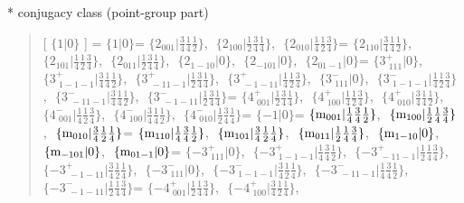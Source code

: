 \documentclass[fleqn,10pt,landscape]{jsarticle}
\begin{document}
* conjugacy class (point-group part)
\begin{quote}
[ $\{1|0\}$ ] = \quad $\{1|0\}$ = \quad $\{2{}_{001}|\frac{3}{4} \frac{1}{4} \frac{1}{2}\}$,\,\, $\{2{}_{100}|\frac{1}{2} \frac{3}{4} \frac{1}{4}\}$,\,\, $\{2{}_{010}|\frac{1}{4} \frac{1}{2} \frac{3}{4}\}$ = \quad $\{2{}_{110}|\frac{3}{4} \frac{1}{4} \frac{1}{2}\}$,\,\, $\{2{}_{101}|\frac{1}{4} \frac{1}{2} \frac{3}{4}\}$,\,\, $\{2{}_{011}|\frac{1}{2} \frac{3}{4} \frac{1}{4}\}$,\,\, $\{2{}_{1-10}|0\}$,\,\, $\{2{}_{-101}|0\}$,\,\, $\{2{}_{01-1}|0\}$\newline[ $\{3^{+}_{\,\,111}|0\}$ ] = \quad $\{3^{+}_{\,\,111}|0\}$,\,\, $\{3^{+}_{\,\,1-1-1}|\frac{3}{4} \frac{1}{4} \frac{1}{2}\}$,\,\, $\{3^{+}_{\,\,-11-1}|\frac{1}{2} \frac{3}{4} \frac{1}{4}\}$,\,\, $\{3^{+}_{\,\,-1-11}|\frac{1}{4} \frac{1}{2} \frac{3}{4}\}$,\,\, $\{3^{-}_{\,\,111}|0\}$,\,\, $\{3^{-}_{\,\,1-1-1}|\frac{1}{4} \frac{1}{2} \frac{3}{4}\}$,\,\, $\{3^{-}_{\,\,-11-1}|\frac{3}{4} \frac{1}{4} \frac{1}{2}\}$,\,\, $\{3^{-}_{\,\,-1-11}|\frac{1}{2} \frac{3}{4} \frac{1}{4}\}$ = \quad $\{4^{+}_{\,\,001}|\frac{1}{2} \frac{3}{4} \frac{1}{4}\}$,\,\, $\{4^{+}_{\,\,100}|\frac{1}{4} \frac{1}{2} \frac{3}{4}\}$,\,\, $\{4^{+}_{\,\,010}|\frac{3}{4} \frac{1}{4} \frac{1}{2}\}$,\,\, $\{4^{-}_{\,\,001}|\frac{1}{4} \frac{1}{2} \frac{3}{4}\}$,\,\, $\{4^{-}_{\,\,100}|\frac{3}{4} \frac{1}{4} \frac{1}{2}\}$,\,\, $\{4^{-}_{\,\,010}|\frac{1}{2} \frac{3}{4} \frac{1}{4}\}$\newline[ $\{-1|0\}$ ] = \quad $\{-1|0\}$ = \quad $\{{\rm m}_{001}|\frac{1}{4} \frac{3}{4} \frac{1}{2}\}$,\,\, $\{{\rm m}_{100}|\frac{1}{2} \frac{1}{4} \frac{3}{4}\}$,\,\, $\{{\rm m}_{010}|\frac{3}{4} \frac{1}{2} \frac{1}{4}\}$ = \quad $\{{\rm m}_{110}|\frac{1}{4} \frac{3}{4} \frac{1}{2}\}$,\,\, $\{{\rm m}_{101}|\frac{3}{4} \frac{1}{2} \frac{1}{4}\}$,\,\, $\{{\rm m}_{011}|\frac{1}{2} \frac{1}{4} \frac{3}{4}\}$,\,\, $\{{\rm m}_{1-10}|0\}$,\,\, $\{{\rm m}_{-101}|0\}$,\,\, $\{{\rm m}_{01-1}|0\}$\newline[ $\{-3^{+}_{\,\,111}|0\}$ ] = \quad $\{-3^{+}_{\,\,111}|0\}$,\,\, $\{-3^{+}_{\,\,1-1-1}|\frac{1}{4} \frac{3}{4} \frac{1}{2}\}$,\,\, $\{-3^{+}_{\,\,-11-1}|\frac{1}{2} \frac{1}{4} \frac{3}{4}\}$,\,\, $\{-3^{+}_{\,\,-1-11}|\frac{3}{4} \frac{1}{2} \frac{1}{4}\}$,\,\, $\{-3^{-}_{\,\,111}|0\}$,\,\, $\{-3^{-}_{\,\,1-1-1}|\frac{3}{4} \frac{1}{2} \frac{1}{4}\}$,\,\, $\{-3^{-}_{\,\,-11-1}|\frac{1}{4} \frac{3}{4} \frac{1}{2}\}$,\,\, $\{-3^{-}_{\,\,-1-11}|\frac{1}{2} \frac{1}{4} \frac{3}{4}\}$ = \quad $\{-4^{+}_{\,\,001}|\frac{1}{2} \frac{1}{4} \frac{3}{4}\}$,\,\, $\{-4^{+}_{\,\,100}|\frac{3}{4} \frac{1}{2} \frac{1}{4}\}$,\,\, 
\end{quote}
\end{document}

